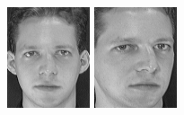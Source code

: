 \begin{figure}[ht]
 \includegraphics[width=\columnwidth/11]{ch3/figures/s1_1.png}
 \includegraphics[width=\columnwidth/11]{ch3/figures/s1_2.png}

\end{figure}

